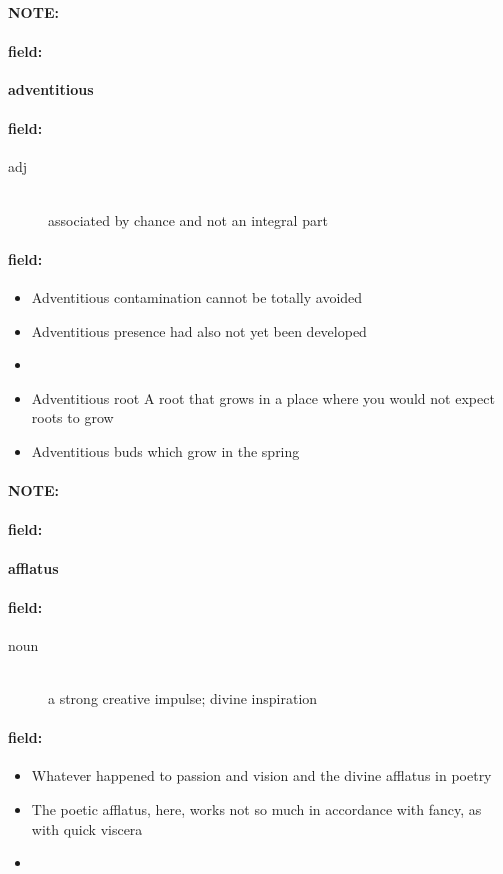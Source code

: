\documentclass[12pt]{article}
\newenvironment{note}{\paragraph{NOTE:}}{}
\newenvironment{field}{\paragraph{field:}}{}
\begin{document}
\begin{note}
\begin{field}
\textbf{\large adventitious}
\end{field}


\begin{field}
\begin{description}
\item[adj] \hfill \\ 
associated by chance and not an integral part

\end{description}
\end{field}

\begin{field}
\begin{itemize}
\item Adventitious contamination cannot be totally avoided
\item Adventitious presence had also not yet been developed
\item 
\item Adventitious root A root that grows in a place where you would not expect roots to grow
\item Adventitious buds which grow in the spring
\end{itemize}
\end{field}
\end{note}
\begin{note}
\begin{field}
\textbf{\large afflatus}
\end{field}


\begin{field}
\begin{description}
\item[noun] \hfill \\ 
a strong creative impulse; divine inspiration

\end{description}
\end{field}

\begin{field}
\begin{itemize}
\item Whatever happened to passion and vision and the divine afflatus in poetry
\item The poetic afflatus, here, works not so much in accordance with fancy, as with quick viscera
\item 
\end{itemize}
\end{field}
\end{note}
\end{document}
